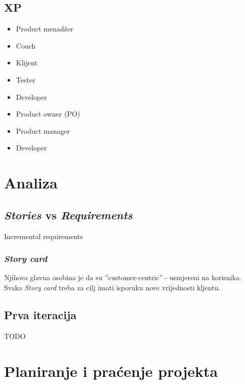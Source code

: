 \documentclass[lmodern, utf8, zavrsni]{fit}
\begin{document}
\section{XP}

\begin{itemize}

  \item{Product menadžer}
  \item{Couch}
  \item{Klijent}
  \item{Tester}
  \item{Developer}

\end{itemize}

\begin{itemize}
    \item Product owner (PO)
    \item Product manager
    \item Developer
\end{itemize}

\chapter{Analiza}

\section{\emph{Stories} vs \emph{Requirements}}

Incremental requirements 

\subsection{\emph{Story card}}

Njihova glavna osobina je da su ''customer-centric'' - usmjereni na korisnika. 
Svaka \emph{Story card} treba za cilj imati isporuku nove vrijednosti kljentu.


\section{Prva iteracija}

TODO

\chapter{Planiranje i praćenje projekta}
\vspace*{-0.7cm}
\end{document}
